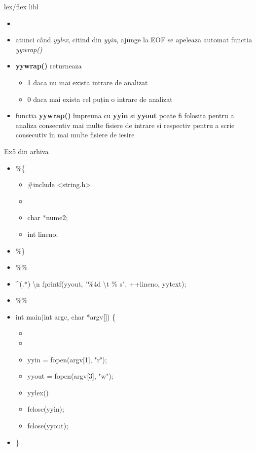 \documentclass[pdf]{beamer}
\begin{document}
\begin{frame}{lex/flex libl}
\begin{itemize}
\item
\textbf{\color{red}{int yywrap(void)}}
\item
atunci când \textit{yylex}, citind din \textit{yyin}, ajunge la EOF se apeleaza automat functia \textit{yywrap()}
\newline

\item
\textbf{yywrap()} returneaza 
\begin{itemize}
\item
1 daca nu mai exista intrare de analizat
\item
0 daca mai exista cel puțin o intrare de analizat
\end{itemize}

\item
functia \textbf{yywrap()} împreuna cu \textbf{yyin} si \textbf{yyout} poate fi folosita pentru a analiza consecutiv mai multe fisiere de intrare si respectiv pentru a scrie consecutiv în mai multe fisiere de iesire

\end{itemize}
\end{frame}



\begin{frame}{Ex5 din arhiva}
\begin{itemize}
\item[]
\%\{
\begin{itemize}
    \item[]
    \#include \textless string.h>
    \item[]
    \color{red}{int second\_file=0;}
    \item[]
    char *nume2;
    \item[]
    int lineno;
\end{itemize}
\item[]
\%\}
\item[]
\%\%
\item[]
\^{}(.*) \textbackslash n fprintf(yyout, "\%4d \textbackslash t \% s", ++lineno, yytext);
\item[]
\%\%
\item[]
int main(int argc, char *argv[]) \{
\begin{itemize}
    \item[]
    \color{red}{nume2=(char*)malloc(sizeof(char)*(strlen(argv[2]+1));}
    \item[]
    \color{red}{strcpy(nume2, argv[2]);}
    \item[]
    yyin = fopen(argv[1], "r");
    \item[]
    yyout = fopen(argv[3], "w");
    \item[]
    yylex()
    \item[]
    fclose(yyin);
    \item[]
    fclose(yyout);

\end{itemize}
\item[]
\}

\end{itemize}
\end{frame}
\end{document}
